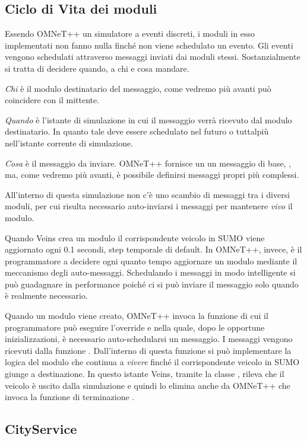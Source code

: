\subsection{Ciclo di Vita dei moduli}\label{subsec:lifecycle}

Essendo OMNeT++ un simulatore a eventi discreti, i moduli in esso implementati non fanno nulla finché non viene schedulato un evento. Gli eventi vengono schedulati attraverso messaggi inviati dai moduli stessi. Sostanzialmente si tratta di decidere quando, a chi e cosa mandare.

\emph{Chi} è il modulo destinatario del messaggio, come vedremo più avanti può coincidere con il mittente.

\emph{Quando} è l'istante di simulazione in cui il messaggio verrà ricevuto dal modulo destinatario. In quanto tale deve essere schedulato nel futuro o tuttalpiù nell'istante corrente di simulazione.

\emph{Cosa} è il messaggio da inviare. OMNeT++ fornisce un un messaggio di base, , ma, come vedremo più avanti, è possibile definirsi messaggi propri più complessi.

All'interno di questa simulazione non c'è uno scambio di messaggi tra i diversi moduli, per cui risulta necessario auto-inviarsi i messaggi per mantenere \emph{vivo} il modulo.

Quando Veins crea un modulo il corrispondente veicolo in SUMO viene aggiornato ogni 0.1 secondi, step temporale di default. In OMNeT++, invece, è il programmatore a decidere ogni quanto tempo aggiornare un modulo mediante il meccanismo degli auto-messaggi. Schedulando i messaggi in modo intelligente si può guadagnare in performance poiché ci si può inviare il messaggio solo quando è realmente necessario.

Quando un modulo  viene creato, OMNeT++ invoca la funzione  di cui il programmatore può eseguire l'override e nella quale, dopo le opportune inizializzazioni, è necessario auto-schedularsi un messaggio. I messaggi vengono ricevuti dalla funzione . Dall'interno di questa funzione si può implementare la logica del modulo che continua a \emph{vivere} finché il corrispondente veicolo in SUMO giunge a destinazione. In questo istante Veins, tramite la classe , rileva che il veicolo è uscito dalla simulazione e quindi lo elimina anche da OMNeT++ che invoca la funzione di terminazione .

\subsection{CityService}\label{sec:module-city}

